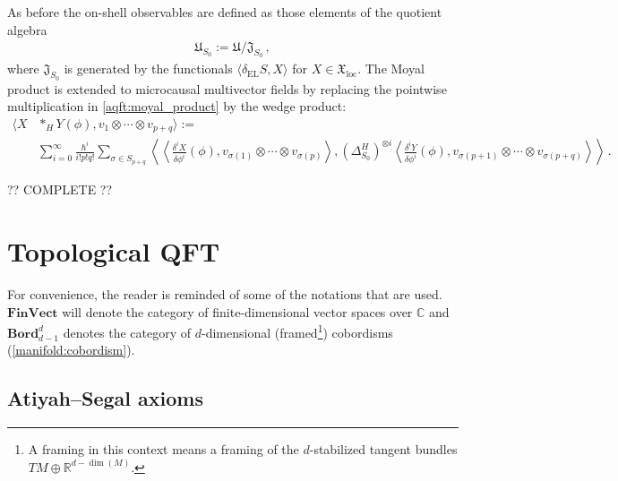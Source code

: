     As before the on-shell observables are defined as those elements of the quotient algebra
    \begin{gather}
        \mathfrak{U}_{S_0} := \mathfrak{U}/\mathfrak{J}_{S_0}\,,
    \end{gather}
    where $\mathfrak{J}_{S_0}$ is generated by the functionals $\langle\delta_{\text{EL}}S,X\rangle$ for $X\in\mathfrak{X}_{\text{loc}}$. The Moyal product is extended to microcausal multivector fields by replacing the pointwise multiplication in \cref{aqft:moyal_product} by the wedge product:
    \begin{align}
        \langle X\!&\ast_H\!Y(\phi),v_1\otimes\cdots\otimes v_{p+q} \rangle := \\
        &\sum_{i=0}^\infty\frac{\hbar^i}{i!p!q!}\sum_{\sigma\in S_{p+q}}\left\langle\!\!\left\langle\frac{\delta^iX}{\delta\phi^i}(\phi),v_{\sigma(1)}\otimes\cdots\otimes v_{\sigma(p)}\right\rangle,(\Delta^H_{S_0})^{\otimes i}\left\langle\frac{\delta^iY}{\delta\phi^i}(\phi),v_{\sigma(p+1)}\otimes\cdots\otimes v_{\sigma(p+q)}\right\rangle\!\!\right\rangle\,.\nonumber
    \end{align}

    ?? COMPLETE ??

\section{Topological QFT}

    For convenience, the reader is reminded of some of the notations that are used. $\mathbf{FinVect}$ will denote the category of finite-dimensional vector spaces over $\mathbb{C}$ and $\mathbf{Bord}^d_{d-1}$ denotes the category of $d$-dimensional (framed\footnote{A framing in this context means a framing of the $d$-stabilized tangent bundles $TM\oplus\mathbb{R}^{d-\dim(M)}$.}) cobordisms (\cref{manifold:cobordism}).

\subsection{Atiyah--Segal axioms}

